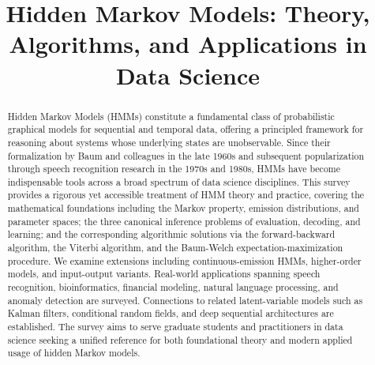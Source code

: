 \documentclass[conference]{IEEEtran}
\begin{document}
\title{Hidden Markov Models: Theory, Algorithms, and Applications in Data Science}

\author{
\and
{}
}

\maketitle

\begin{abstract}
Hidden Markov Models (HMMs) constitute a fundamental class of probabilistic graphical models for sequential and temporal data, offering a principled framework for reasoning about systems whose underlying states are unobservable. Since their formalization by Baum and colleagues in the late 1960s and subsequent popularization through speech recognition research in the 1970s and 1980s, HMMs have become indispensable tools across a broad spectrum of data science disciplines. This survey provides a rigorous yet accessible treatment of HMM theory and practice, covering the mathematical foundations including the Markov property, emission distributions, and parameter spaces; the three canonical inference problems of evaluation, decoding, and learning; and the corresponding algorithmic solutions via the forward-backward algorithm, the Viterbi algorithm, and the Baum-Welch expectation-maximization procedure. We examine extensions including continuous-emission HMMs, higher-order models, and input-output variants. Real-world applications spanning speech recognition, bioinformatics, financial modeling, natural language processing, and anomaly detection are surveyed. Connections to related latent-variable models such as Kalman filters, conditional random fields, and deep sequential architectures are established. The survey aims to serve graduate students and practitioners in data science seeking a unified reference for both foundational theory and modern applied usage of hidden Markov models.
\end{abstract}
\end{document}
